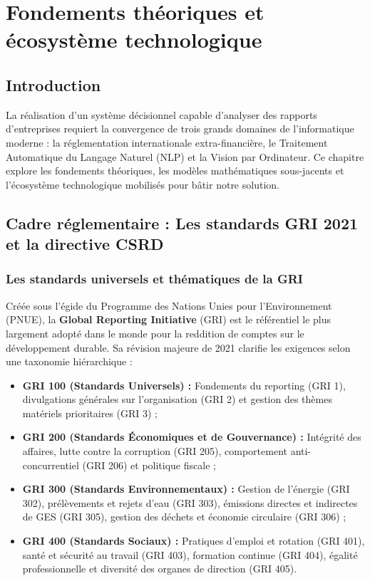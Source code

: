 \documentclass[12pt,a4paper]{report}
\begin{document}
\chapter{Fondements théoriques et écosystème technologique}

\section{Introduction}
La réalisation d'un système décisionnel capable d'analyser des rapports d'entreprises requiert la convergence de trois grands domaines de l'informatique moderne : la réglementation internationale extra-financière, le Traitement Automatique du Langage Naturel (NLP) et la Vision par Ordinateur. Ce chapitre explore les fondements théoriques, les modèles mathématiques sous-jacents et l'écosystème technologique mobilisés pour bâtir notre solution.

\section{Cadre réglementaire : Les standards GRI 2021 et la directive CSRD}

\subsection{Les standards universels et thématiques de la GRI}
Créée sous l'égide du Programme des Nations Unies pour l'Environnement (PNUE), la \textbf{Global Reporting Initiative} (GRI) est le référentiel le plus largement adopté dans le monde pour la reddition de comptes sur le développement durable. Sa révision majeure de 2021 clarifie les exigences selon une taxonomie hiérarchique :
\begin{itemize}
    \item \textbf{GRI 100 (Standards Universels) :} Fondements du reporting (GRI 1), divulgations générales sur l'organisation (GRI 2) et gestion des thèmes matériels prioritaires (GRI 3) ;
    \item \textbf{GRI 200 (Standards Économiques et de Gouvernance) :} Intégrité des affaires, lutte contre la corruption (GRI 205), comportement anti-concurrentiel (GRI 206) et politique fiscale ;
    \item \textbf{GRI 300 (Standards Environnementaux) :} Gestion de l'énergie (GRI 302), prélèvements et rejets d'eau (GRI 303), émissions directes et indirectes de GES (GRI 305), gestion des déchets et économie circulaire (GRI 306) ;
    \item \textbf{GRI 400 (Standards Sociaux) :} Pratiques d'emploi et rotation (GRI 401), santé et sécurité au travail (GRI 403), formation continue (GRI 404), égalité professionnelle et diversité des organes de direction (GRI 405).
\end{itemize}
\end{document}
